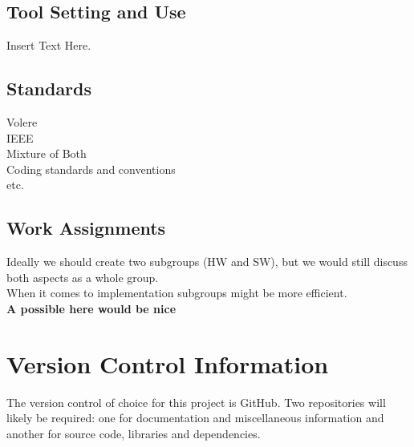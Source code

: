 \documentclass [12pt]{article}
\begin{document}
\subsection{Tool Setting and Use}
Insert Text Here.


\subsection{Standards}
Volere\\
IEEE\\
Mixture of Both\\
Coding standards and conventions\\
etc. 

\subsection{Work Assignments}

Ideally we should create two subgroups (HW and SW), but we would still
discuss both aspects as a whole group.\\ When it comes to implementation subgroups might be more efficient. \\

\textbf{A possible here would be nice }






\section{Version Control Information}
The version control of choice for this project is GitHub. Two repositories will likely be required: one for documentation and miscellaneous information and another for source code, libraries and dependencies. 
\end{document}
